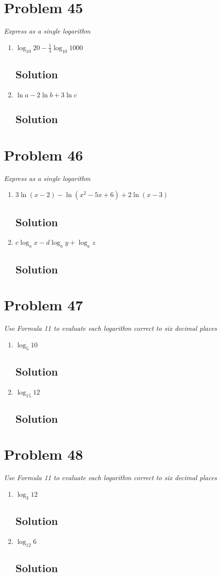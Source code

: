 \documentclass[11pt]{article}
\newcommand{\soln}{\subsection*}
\newcommand{\qn}{\textit}
\begin{document}
\section*{Problem 45}

\qn{Express as a single logarithm}
\begin{enumerate}
	\item \qn{$\log_{10}{20} - \frac{1}{3}\log_{10}{1000}$}
	\soln{Solution}
	
	\item \qn{$\ln{a}-2\ln{b}+3\ln{c}$}
	\soln{Solution}
\end{enumerate}

\section*{Problem 46}

\qn{Express as a single logarithm}
\begin{enumerate}
	\item \qn{$3\ln(x-2)-\ln(x^2-5x+6)+2\ln(x-3)$}
	\soln{Solution}
	
	\item \qn{$c\log_a{x}-d\log_a{y}+\log_a{z}$}
	\soln{Solution}
\end{enumerate}

\section*{Problem 47}

\qn{Use Formula 11 to evaluate each logarithm correct to six decimal places}
\begin{enumerate}
	\item \qn{$\log_5{10}$}
	\soln{Solution}
	
	\item \qn{$\log_{15}{12}$}
	\soln{Solution}
\end{enumerate}

\section*{Problem 48}

\qn{Use Formula 11 to evaluate each logarithm correct to six decimal places}
\begin{enumerate}
	\item \qn{$\log_3{12}$}
	\soln{Solution}
	
	\item \qn{$\log_{12}6$}
	\soln{Solution}
\end{enumerate}
\end{document}
